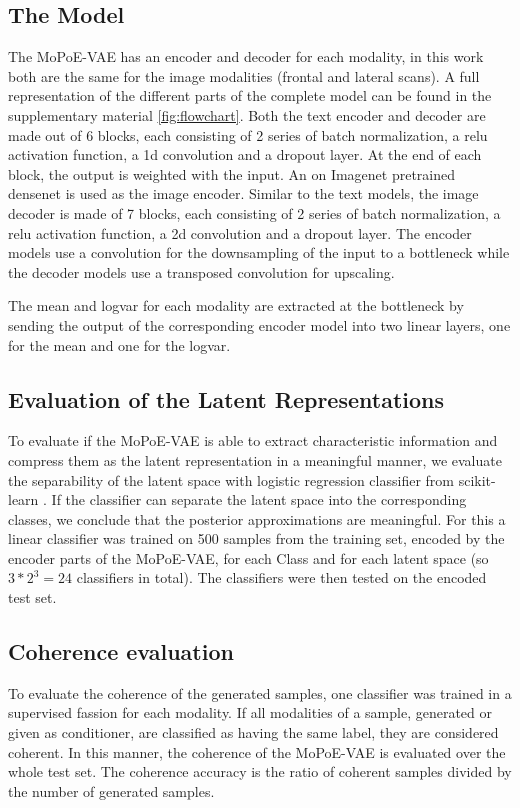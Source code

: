 \subsection{The Model}
The MoPoE-VAE has an encoder and decoder for each modality, in this work both are the same for the image modalities (frontal and lateral scans).
A full representation of the different parts of the complete model can be found in the supplementary material \cref{fig:flowchart}.
Both the text encoder and decoder are made out of 6 blocks, each consisting of 2 series of batch normalization, a relu activation function, a 1d convolution and a dropout layer.
At the end of each block, the output is weighted with the input.
An on Imagenet \cite{imagenet_cvpr09} pretrained densenet \cite{huang2018densely} is used as the image encoder.
Similar to the text models, the image decoder is made of 7 blocks, each consisting of 2 series of batch normalization, a relu activation function, a 2d convolution and a dropout layer.
The encoder models use a convolution for the downsampling of the input to a bottleneck while the decoder models use a transposed convolution for upscaling.

The mean and logvar for each modality are extracted at the bottleneck by sending the output of the corresponding encoder model into two linear layers, one for the mean and one for the logvar.


\subsection{Evaluation of the Latent Representations}
To evaluate if the MoPoE-VAE is able to extract characteristic information and compress them as the latent representation in a meaningful manner, we evaluate the separability of the latent space with logistic regression classifier from scikit-learn \cite{scikit}.
If the classifier can separate the latent space into the corresponding classes, we conclude that the posterior approximations are meaningful.
For this a linear classifier was trained on 500 samples from the training set, encoded by the encoder parts of the MoPoE-VAE, for each Class and for each latent space (so $3*2^3 = 24$ classifiers in total).
The classifiers were then tested on the encoded test set.
\subsection{Coherence evaluation}
To evaluate the coherence of the generated samples, one classifier was trained in a supervised fassion for each modality.
If all modalities of a sample, generated or given as conditioner, are classified as having the same label, they are considered coherent.
In this manner, the coherence of the MoPoE-VAE is evaluated over the whole test set.
The coherence accuracy is the ratio of coherent samples divided by the number of generated samples.

